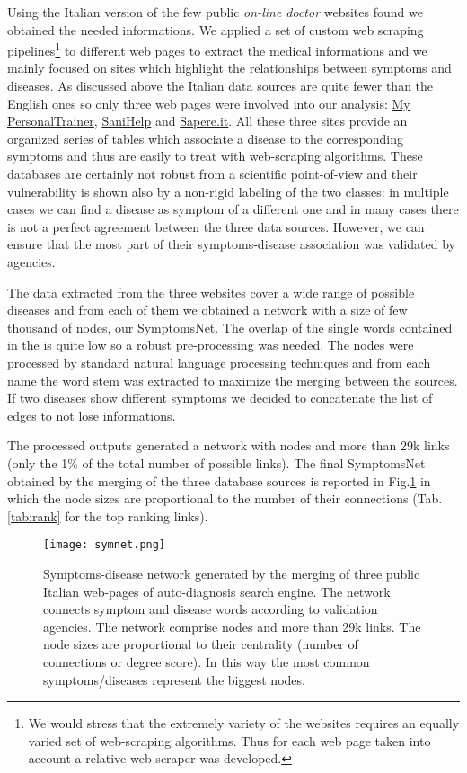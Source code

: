 \documentclass{standalone}
\begin{document}
Using the Italian version of the few public \emph{on-line doctor} websites found we obtained the needed informations.
We applied a set of custom web scraping pipelines\footnote{
  We would stress that the extremely variety of the websites requires an equally varied set of web-scraping algorithms.
  Thus for each web page taken into account a relative web-scraper was developed.
} to different web pages to extract the medical informations and we mainly focused on sites which highlight the relationships between symptoms and diseases.
As discussed above the Italian data sources are quite fewer than the English ones so only three web pages were involved into our analysis: \href{https://m.my-personaltrainer.it/}{My PersonalTrainer}, \href{http://www.sanihelp.it/}{SaniHelp} and \href{http://www.sapere.it/}{Sapere.it}.
All these three sites provide an organized series of tables which associate a disease to the corresponding symptoms and thus are easily to treat with web-scraping algorithms.
These databases are certainly not robust from a scientific point-of-view and their vulnerability is shown also by a non-rigid labeling of the two classes: in multiple cases we can find a disease as symptom of a different one and in many cases there is not a perfect agreement between the three data sources.
However, we can ensure that the most part of their symptoms-disease association was validated by  agencies.

The data extracted from the three websites cover a wide range of possible diseases and from each of them we obtained a network with a size of few thousand of nodes, our \textsf{SymptomsNet}.
The overlap of the single words contained in the  is quite low so a robust pre-processing was needed.
The nodes were processed by standard natural language processing techniques and from each name the word stem was extracted to maximize the merging between the sources.
If two diseases show different symptoms we decided to concatenate the list of edges to not lose informations.

The processed outputs generated a network with  nodes and more than 29k links (only the 1\% of the total number of possible links).
The final \textsf{SymptomsNet} obtained by the merging of the three database sources is reported in Fig.\ref{fig:net} in which the node sizes are proportional to the number of their connections (Tab.\ref{tab:rank} for the top ranking links).

\begin{figure}[htbp]
\centering
\texttt{[image: symnet.png]}
\caption{Symptoms-disease network generated by the merging of three public Italian web-pages of auto-diagnosis search engine.
The network connects symptom and disease words according to validation agencies.
The network comprise  nodes and more than 29k links.
The node sizes are proportional to their centrality (number of connections or degree score).
In this way the most common symptoms/diseases represent the biggest nodes.
}
\label{fig:net}
\end{figure}
\end{document}
